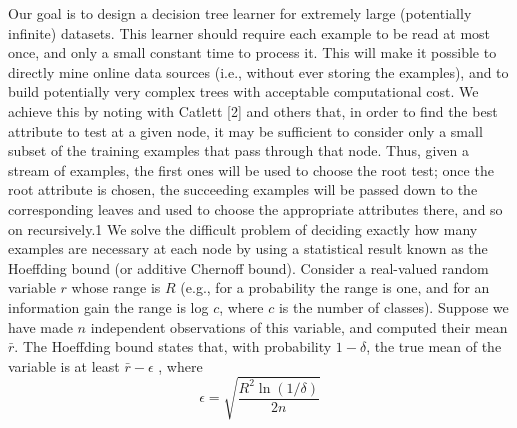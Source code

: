 \documentclass[sigplan]{acmart}\settopmatter{printfolios=true,printccs=false,printacmref=false}
\begin{document}
Our goal is to design a decision tree learner for extremely large (potentially infinite) datasets. This learner should require each example to be read at most once, and only a small
constant time to process it. This will make it possible to directly mine online data sources (i.e., without ever storing the examples), and to build potentially very complex trees with
acceptable computational cost. We achieve this by noting with Catlett [2] and others that, in order to find the best attribute to test at a given node, it may be sufficient to consider only a small subset of the training examples that pass 
through that node. Thus, given a stream of examples, the first ones will be used to choose the root test; once the root attribute is chosen, the succeeding examples will be passed
down to the corresponding leaves and used to choose the appropriate attributes there, and so on recursively.1 We solve the difficult problem of deciding exactly how many examples are necessary at each node by using a statistical result known as the Hoeffding bound (or additive Chernoff bound). Consider a real-valued random variable $r$ whose range is $R$ (e.g., for a probability the range is one, and for an information gain the range is log $c$, where $c$ is the number of classes). Suppose we have made $n$ independent observations of this variable, and computed their mean $\bar{r}$. The Hoeffding bound states that, with probability $1-\delta$, the true mean of the variable is at least $\bar{r}-\epsilon$ , where 
\begin{equation}
	\epsilon = \sqrt{\frac{R^2\ln(1/\delta)}{2n}}
\end{equation}
\end{document}
